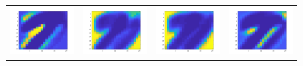 \documentclass{article} %
\begin{document}
\begin{figure}[H]
\begin{tabular}{cccc}
\includegraphics[width=0.2\linewidth]{images/Fig_act_17.png}
&
\includegraphics[width=0.2\linewidth]{images/Fig_act_18.png}
&
\includegraphics[width=0.2\linewidth]{images/Fig_act_19.png}
&
\includegraphics[width=0.2\linewidth]{images/Fig_act_20.png}
\end{tabular}
\end{figure}
\end{document}

